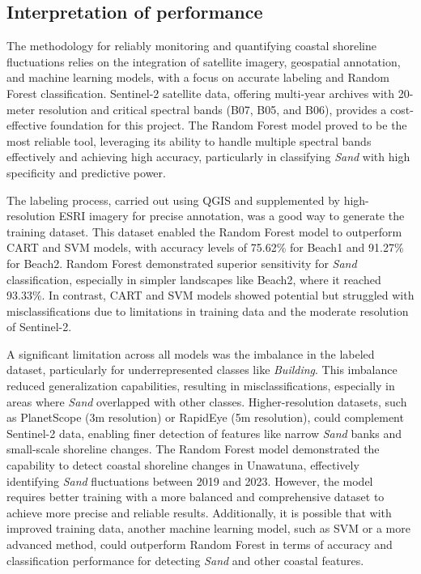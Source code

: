 \documentclass[a4paper,12pt]{article}
\begin{document}
\subsection{Interpretation of performance}
The methodology for reliably monitoring and quantifying coastal shoreline fluctuations relies on the integration of satellite imagery, geospatial annotation, and machine learning models, with a focus on accurate labeling and Random Forest classification. Sentinel-2 satellite data, offering multi-year archives with 20-meter resolution and critical spectral bands (B07, B05, and B06), provides a cost-effective foundation for this project. The Random Forest model proved to be the most reliable tool, leveraging its ability to handle multiple spectral bands effectively and achieving high accuracy, particularly in classifying \textit{Sand} with high specificity and predictive power.

The labeling process, carried out using QGIS and supplemented by high-resolution ESRI imagery for precise annotation, was a good way to generate the training dataset. This dataset enabled the Random Forest model to outperform CART and SVM models, with accuracy levels of 75.62\% for Beach1 and 91.27\% for Beach2. Random Forest demonstrated superior sensitivity for \textit{Sand} classification, especially in simpler landscapes like Beach2, where it reached 93.33\%. In contrast, CART and SVM models showed potential but struggled with misclassifications due to limitations in training data and the moderate resolution of Sentinel-2.

A significant limitation across all models was the imbalance in the labeled dataset, particularly for underrepresented classes like \textit{Building}. This imbalance reduced generalization capabilities, resulting in misclassifications, especially in areas where \textit{Sand} overlapped with other classes. Higher-resolution datasets, such as PlanetScope (3m resolution) or RapidEye (5m resolution), could complement Sentinel-2 data, enabling finer detection of features like narrow \textit{Sand} banks and small-scale shoreline changes.
The Random Forest model demonstrated the capability to detect coastal shoreline changes in Unawatuna, effectively identifying \textit{Sand} fluctuations between 2019 and 2023. However, the model requires better training with a more balanced and comprehensive dataset to achieve more precise and reliable results. Additionally, it is possible that with improved training data, another machine learning model, such as SVM or a more advanced method, could outperform Random Forest in terms of accuracy and classification performance for detecting \textit{Sand} and other coastal features.
\end{document}
